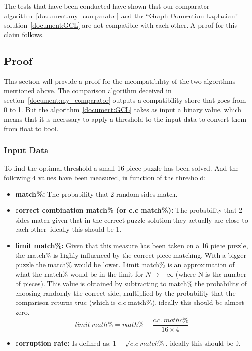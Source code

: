\documentclass{article}
\begin{document}
The tests that have been conducted have shown that our comparator algorithm~\ref{document:my_comparator}
and the “Graph Connection Laplacian” solution~\ref{document:GCL} are not compatible with each other.
A proof for this claim follows.

\subsection{Proof}

This section will provide a proof for the incompatibility of
the two algorithms mentioned above.
\newline
The comparison algorithm deceived in section~\ref{document:my_comparator} outputs a compatibility
shore that goes from 0 to 1.\newline
But the algorithm~\ref{document:GCL} takes as input a binary value,
which means that it is necessary to apply a threshold to the input
data to convert them from float to bool.
\subsubsection{Input Data}
To find the optimal threshold a small 16 piece puzzle has been solved.
And the following 4 values have been measured, in function of the threshold:

\begin{itemize}
  \item \textbf{match\%:}\newline
  The probability that 2 random sides match.
  
  \item \textbf{correct combination match\% (or c.c match\%):}\newline
  The probability that 2 sides match given that in the correct puzzle
  solution they actually are close to each other. ideally this should be 1.
  
  \item \textbf{limit match\%:}\newline
  Given that this measure has been taken on a 16 piece puzzle,
  the match\% is highly influenced by the correct piece matching.
  With a bigger puzzle the match\% would be lower.
  Limit match\% is an approximation of what the match\%
  would be in the limit for \(N \rightarrow + \infty\) (where N is the number of pieces).
  This value is obtained by subtracting to match\%
  the probability of choosing randomly the correct side,
  multiplied by the probability that the comparison returns true
  (which is c.c match\%). ideally this should be almost zero.
  \[limit \: math\% = math\% - \frac{c.c. \: mathc\%}{16 \times 4}\]
  
  \item \textbf{corruption rate:}\newline
  Is defined as: \(1-\sqrt{c.c \: match\%}\). ideally this should be 0.

\end{itemize}
\end{document}

